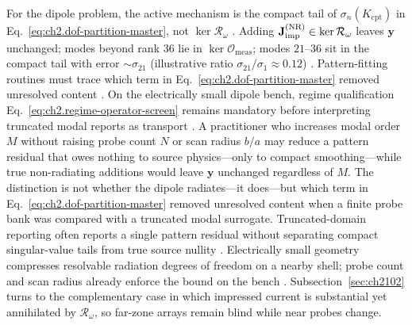 For the dipole problem, the active mechanism is the compact tail of
\(\sigma_n(K_{\mathrm{cpt}})\) in Eq.~\eqref{eq:ch2.dof-partition-master}, not
\(\ker\mathcal{R}_\omega\) \cite{stratton1941}. Adding
\(\mathbf{J}_{\mathrm{imp}}^{\mathrm{(NR)}}\in\ker\mathcal{R}_\omega\) leaves \(\mathbf{y}\) unchanged;
modes beyond rank \(36\) lie in \(\ker\mathcal{O}_{\mathrm{meas}}\); modes \(21\)–\(36\) sit in
the compact tail with error \(\sim\sigma_{21}\) (illustrative ratio \(\sigma_{21}/\sigma_1\approx 0.12\))
\cite{stratton1941}. Pattern-fitting routines must trace which term in
Eq.~\eqref{eq:ch2.dof-partition-master} removed unresolved content
\cite{harrington2001}.
On the electrically small dipole bench, regime qualification
Eq.~\eqref{eq:ch2.regime-operator-screen} remains mandatory before interpreting truncated modal
reports as transport \cite{harrington2001}. A practitioner who increases modal order $M$ without
raising probe count $N$ or scan radius $b/a$ may reduce a pattern residual that owes nothing to
source physics---only to compact smoothing---while true non-radiating additions would leave
$\mathbf{y}$ unchanged regardless of $M$.
The distinction is not whether the dipole radiates---it does---but which term in Eq.~\eqref{eq:ch2.dof-partition-master} removed unresolved content when a finite probe bank was compared with a truncated modal surrogate. Truncated-domain reporting often reports a single pattern residual without separating compact singular-value tails from true source nullity \cite{hansen1988}. Electrically small geometry compresses resolvable radiation degrees of freedom on a nearby shell; probe count and scan radius already enforce the bound on the bench \cite{stratton1941}. Subsection~\ref{sec:ch2102} turns to the complementary case in which impressed current is substantial yet annihilated by $\mathcal{R}_\omega$, so far-zone arrays remain blind while near probes change.
